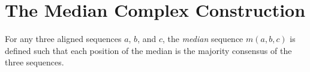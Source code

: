 


\section{The Median Complex Construction}
\label{sec:median_complex}
%
\begin{defn}
  \label{defn:median}
  For any three aligned sequences $a$, $b$, and $c$, the \emph{median} sequence $m(a,b,c)$ is defined such that each position of the median is the majority consensus of the three sequences.
\end{defn}


